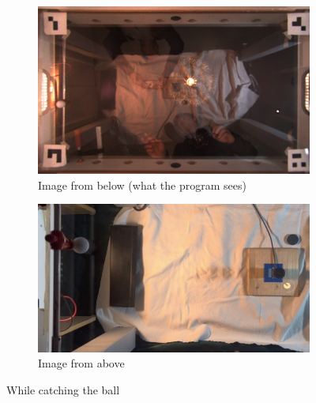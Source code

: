 \begin{figure}[H]
    \centering
    \begin{subfigure}{.5\textwidth}
        \centering
        \includegraphics[width=.9\textwidth]{../photos/player_catch_bottom}
        \caption{Image from below (what the program sees)}
        \label{fig:player_catch_bottom}
    \end{subfigure}%
    \begin{subfigure}{.5\textwidth}
        \centering
        \includegraphics[width=.9\textwidth]{../photos/catch_top}
        \caption{Image from above}
        \label{fig:before_top}
    \end{subfigure}
    \caption{While catching the ball}
    \label{fig:catch}
\end{figure}
